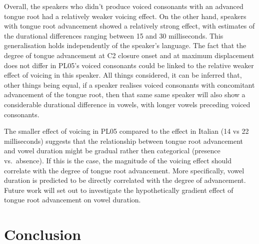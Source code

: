 \documentclass[authoryear, twocolumn]{elsarticle}
\begin{document}
Overall, the speakers who didn't produce voiced consonants with an
advanced tongue root had a relatively weaker voicing effect. On the
other hand, speakers with tongue root advancement showed a relatively
strong effect, with estimates of the durational differences ranging
between 15 and 30 milliseconds. This generalisation holds independently
of the speaker's language. The fact that the degree of tongue
advancement at C2 closure onset and at maximum displacement does not
differ in PL05's voiced consonants could be linked to the relative
weaker effect of voicing in this speaker. All things considered, it can
be inferred that, other things being equal, if a speaker realises voiced
consonants with concomitant advancement of the tongue root, then that
same same speaker will also show a considerable durational difference in
vowels, with longer vowels preceding voiced consonants.

The smaller effect of voicing in PL05 compared to the effect in Italian
(14 vs 22 milliseconds) suggests that the relationship between tongue
root advancement and vowel duration might be gradual rather then
categorical (presence vs.~absence). If this is the case, the magnitude
of the voicing effect should correlate with the degree of tongue root
advancement. More specifically, vowel duration is predicted to be
directly correlated with the degree of advancement. Future work will set
out to investigate the hypothetically gradient effect of tongue root
advancement on vowel duration.

\section{Conclusion}
\label{s:conclusion}


\end{document}

